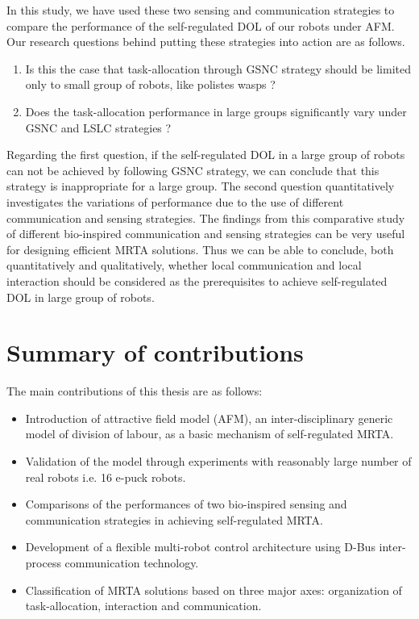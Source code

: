 In this study, we have used these two sensing and communication strategies to compare the performance of the self-regulated DOL of our robots under AFM. %
Our research questions behind putting these strategies into action are as follows.
\begin{enumerate}
\item Is this the case that task-allocation through GSNC strategy should be limited only to  small group of robots, like polistes wasps ?
\item 
Does the task-allocation performance  in large groups  significantly vary under GSNC and LSLC strategies ?
\end{enumerate}
Regarding the first question, if the self-regulated DOL in a large group of robots can not be achieved by following GSNC strategy, we can  conclude that this strategy is inappropriate for a large group. The second question quantitatively investigates the variations of performance due to the use of different  communication and sensing strategies.
The findings from this  comparative study of different bio-inspired  communication and sensing strategies can be very useful  for designing efficient MRTA solutions. Thus we can be able to conclude, both quantitatively and qualitatively, whether local communication and local interaction should be considered as the prerequisites to achieve self-regulated DOL in large group of robots.
\section{Summary of contributions}
The main contributions of this thesis are as follows:
\begin{itemize}
\item Introduction of attractive field model (AFM), an  inter-disciplinary generic model of division of labour, as a basic mechanism of  self-regulated MRTA.
\item Validation of the model through experiments with reasonably large number of real robots i.e. 16 e-puck robots.
\item Comparisons of the performances of two bio-inspired sensing and communication strategies in achieving self-regulated MRTA.
\item Development of a flexible multi-robot control architecture using D-Bus inter-process communication technology.
\item Classification of MRTA solutions based on three major axes: organization of task-allocation, interaction and communication.
\end{itemize}
